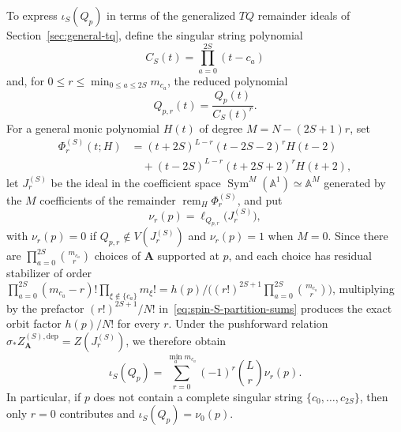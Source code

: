\documentclass[11pt]{article}
\theoremstyle{definition}
\newcommand{\A}{\mathbb{A}}
\newcommand{\Sym}{\operatorname{Sym}}
\begin{document}
To express $\iota_S(Q_p)$ in terms of the generalized $TQ$ remainder ideals of Section~\ref{sec:general-tq}, define the singular string polynomial
\[
 C_S(t)=\prod_{a=0}^{2S}(t-c_a)
\]
and, for $0\le r\le\min_{0\le a\le 2S} m_{c_a}$, the reduced polynomial
\[
 Q_{p,r}(t)=\frac{Q_p(t)}{C_S(t)^r}.
\]
For a general monic polynomial $H(t)$ of degree $M=N-(2S+1)r$, set
\[
 \begin{aligned}
 \Phi_r^{(S)}(t;H)
 &=(t+2S)^{L-r}(t-2S-2)^r H(t-2)\\
 &\quad{}+(t-2S)^{L-r}(t+2S+2)^r H(t+2),
 \end{aligned}
\]
let $J_r^{(S)}$ be the ideal in the coefficient space $\Sym^M(\A^1)\simeq\A^M$ generated by the $M$ coefficients of the remainder
$\operatorname{rem}_H\Phi_r^{(S)}$, and put
\[
 \nu_r(p)=\ell_{Q_{p,r}}\bigl(J_r^{(S)}\bigr),
\]
with $\nu_r(p)=0$ if $Q_{p,r}\notin V(J_r^{(S)})$ and $\nu_r(p)=1$ when $M=0$.
Since there are $\prod_{a=0}^{2S}\binom{m_{c_a}}{r}$ choices of $\mathbf{A}$ supported at $p$, and each choice has residual stabilizer of order $\prod_{a=0}^{2S}(m_{c_a}-r)!\prod_{\xi\notin\{c_a\}}m_\xi!=h(p)/\bigl((r!)^{2S+1}\prod_{a=0}^{2S}\binom{m_{c_a}}{r}\bigr)$, multiplying by the prefactor $(r!)^{2S+1}/N!$ in~\eqref{eq:spin-S-partition-sums} produces the exact orbit factor $h(p)/N!$ for every $r$.
Under the pushforward relation $\sigma_*Z_{\mathbf{A}}^{(S),\mathrm{dep}}=Z(J_r^{(S)})$, we therefore obtain
\begin{equation}\label{eq:spin-S-coefficient-index}
 \boxed{\iota_S(Q_p)=
 \sum_{r=0}^{\min_a m_{c_a}}(-1)^r\binom{L}{r}\nu_r(p).}
\end{equation}
In particular, if $p$ does not contain a complete singular string $\{c_0,\ldots,c_{2S}\}$, then only $r=0$ contributes and $\iota_S(Q_p)=\nu_0(p)$.
\end{document}
